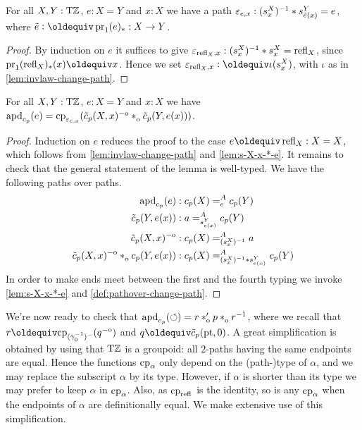 \documentclass[a4paper,12pt]{amsart}
\begin{document}
\begin{lemma}\label{lem:s-X-x-*-e}
  For all $X,Y:{\mathrm{T}\mathbb{Z}}$, $e: X=Y$ and $x:X$ we have a path
  $\varepsilon_{e,x} : (s^X_x)^{-1} * s^Y_{\tilde {e}(x)} = e$,
  where $\ptoe{e}\defeq \pr_1(e)_* : X\to Y$.
\end{lemma}
\begin{proof}
By induction on $e$ it suffices to give
$\varepsilon_{\mathop{{\mathrm{refl}}_{X}},x} : (s^X_x)^{-1} * s^X_x = \mathop{{\mathrm{refl}}_{X}}$,
since $\pr_1(\refl{X})_*(x) \jdeq x$.
Hence we set $\varepsilon_{\refl{X},x} \defeq \iota(s^X_x)$,
with $\iota$ as in \cref{lem:invlaw-change-path}.
\end{proof}

\begin{lemma}\label{lem:apd-c-tilde-c}
For all $X,Y:{\mathrm{T}\mathbb{Z}}$, $e: X=Y$ and $x:X$ we have
$\apd{c_p}(e) = \cp{\varepsilon_{e,x}}
(\tilde c_p(X,x)\invo\cto \tilde c_p(Y,e(x)))$.
\end{lemma}
\begin{proof}
Induction on $e$ reduces the proof to the case $e\jdeq\refl{X}: X=X$,
which follows from \cref{lem:invlaw-change-path} and \cref{lem:s-X-x-*-e}.
It remains to check that the general statement of the lemma is well-typed.
We have the following paths over paths.
\begin{align*}
\apd{c_p}(e) &: c_p(X) =^A_e c_p(Y)\\
\tilde c_p(Y,e(x)) &:  a =^A_{s^Y_{e(x)}} c_p(Y)\\
\tilde c_p(X,x)\invo &: c_p(X) =^A_{(s^X_x)^{-1}} a\\
\tilde c_p(X,x)\invo \cto c_p(Y,e(x)) &:
     c_p(X) =^A_{(s^X_x)^{-1}\ct s^Y_{e(x)}} c_p(Y)
\end{align*}
In order to make ends meet between the first and the fourth typing
we invoke \cref{lem:s-X-x-*-e} and \cref{def:pathover-change-path}.
\end{proof}

We're now ready to check that $\apd{c_p}(\Zloop) = r \ctop p \cto r^{-1}$,
where we recall that $r\jdeq\cp{(\gamma_0^{-1})^-}(q\invo)$ and $q\jdeq\tilde c_p(\pt,0)$.
A great simplification is obtained by using that ${\mathrm{T}\mathbb{Z}}$ is a groupoid:
all $2$-paths having the same endpoints are equal.
Hence the functions $\mathrm{cp}_{\alpha}$ only depend on the (path-)type
of $\alpha$, and we may replace the subscript $\alpha$ by its type.
However, if $\alpha$ is shorter than its type we may
prefer to keep $\alpha$ in $\mathrm{cp}_{\alpha}$.
Also, as $\mathrm{cp}_{\mathop{{\mathrm{refl}}_{}}}$ is the identity, so is any $\mathrm{cp}_{\alpha}$
when the endpoints of $\alpha$ are definitionally equal.
We make extensive use of this simplification.
\end{document}
